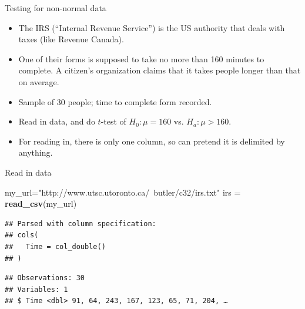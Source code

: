 \documentclass[ignorenonframetext,]{beamer}
\newenvironment{Shaded}{\begin{snugshade}}{\end{snugshade}}
\newcommand{\KeywordTok}[1]{\textcolor[rgb]{0.13,0.29,0.53}{\textbf{#1}}}
\newcommand{\NormalTok}[1]{#1}
\newcommand{\OperatorTok}[1]{\textcolor[rgb]{0.81,0.36,0.00}{\textbf{#1}}}
\newcommand{\StringTok}[1]{\textcolor[rgb]{0.31,0.60,0.02}{#1}}
\providecommand{\tightlist}{%
  \setlength{\itemsep}{0pt}\setlength{\parskip}{0pt}}
\begin{document}
\begin{frame}{Testing for non-normal data}
\protect\hypertarget{testing-for-non-normal-data}{}

\begin{itemize}
\tightlist
\item
  The IRS (``Internal Revenue Service'') is the US authority that deals
  with taxes (like Revenue Canada).
\item
  One of their forms is supposed to take no more than 160 minutes to
  complete. A citizen's organization claims that it takes people longer
  than that on average.
\item
  Sample of 30 people; time to complete form recorded.
\item
  Read in data, and do \(t\)-test of \(H_0 : \mu = 160\) vs.
  \(H_a : \mu > 160\).
\item
  For reading in, there is only one column, so can pretend it is
  delimited by anything.
\end{itemize}

\end{frame}

\begin{frame}[fragile]{Read in data}
\protect\hypertarget{read-in-data}{}

\begin{Shaded}
\begin{Highlighting}[]
\NormalTok{my_url=}\StringTok{"http://www.utsc.utoronto.ca/~butler/c32/irs.txt"}
\NormalTok{irs =}\StringTok{ }\KeywordTok{read_csv}\NormalTok{(my_url)}
\end{Highlighting}
\end{Shaded}

\begin{verbatim}
## Parsed with column specification:
## cols(
##   Time = col_double()
## )
\end{verbatim}

\begin{Shaded}
\end{Shaded}

\begin{verbatim}
## Observations: 30
## Variables: 1
## $ Time <dbl> 91, 64, 243, 167, 123, 65, 71, 204, …
\end{verbatim}

\end{frame}
\end{document}
